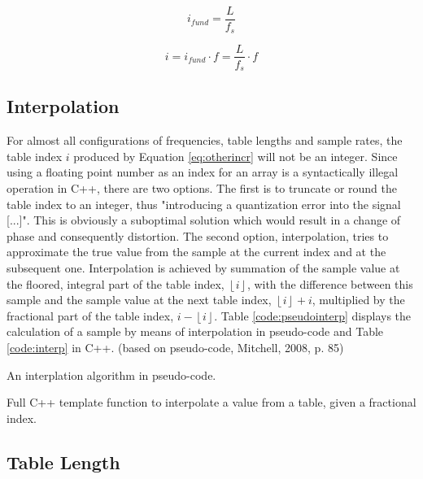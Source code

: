 \documentclass[12pt,twoside]{report}
\begin{document}
\begin{equation}
  i_{fund} = \frac{L}{f_{s}}
  \label{eq:fundincr}
\end{equation}

\begin{equation}
  i = i_{fund} \cdot f = \frac{L}{f_{s}} \cdot f
  \label{eq:otherincr}
\end{equation}

\subsection{Interpolation}

For almost all configurations of frequencies, table lengths and sample rates, the table index $i$ produced by Equation \ref{eq:otherincr} will not be an integer. Since using a floating point number as an index for an array is a syntactically illegal operation in C++, there are two options. The first is to truncate or round the table index to an integer, thus "introducing a quantization error into the signal [...]". This is obviously a suboptimal solution which would result in a change of phase and consequently distortion.  The second option, interpolation, tries to approximate the true value from the sample at the current index and at the subsequent one. Interpolation is achieved by summation of the sample value at the floored, integral part of the table index, $\left \lfloor{i}\right \rfloor$, with the difference between this sample and the sample value at the next table index, $\left \lfloor {i}\right \rfloor + i$, multiplied by the fractional part of the table index, $i - \left \lfloor {i}\right \rfloor$. Table \ref{code:pseudointerp} displays the calculation of a sample by means of interpolation in pseudo-code and Table \ref{code:interp} in C++. (based on pseudo-code, Mitchell, 2008, p. 85)

\begin{table}
  \caption{An interplation algorithm in pseudo-code.}
  \label{code:pseudointerp}
\end{table}

\begin{table}
  \caption{Full C++ template function to interpolate a value from a table, given a fractional index. }
  \label{code:interp}
\end{table}

\subsection{Table Length}
\end{document}
